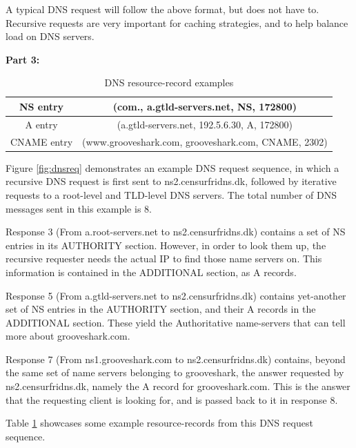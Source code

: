 A typical DNS request will follow the above format, but does not have to. Recursive requests are very important for caching strategies, and
to help balance load on DNS servers.

\noindent \textbf{Part 3:}\\
\begin{table}
\begin{tabular*}{1\textwidth}{| c | c |}
	\hline
	NS entry & (com., a.gtld-servers.net, NS, 172800)\\
	\hline
	A entry & (a.gtld-servers.net, 192.5.6.30, A, 172800)\\
	\hline
	CNAME entry & (www.grooveshark.com, grooveshark.com, CNAME, 2302)\\
	\hline
\end{tabular*}
\caption{DNS resource-record examples}
\label{tbl:rrexamples}
\end{table}

Figure \ref{fig:dnsreq} demonstrates an example DNS request sequence, in which a recursive DNS request is first sent to ns2.censurfridns.dk,
followed by iterative requests to a root-level and TLD-level DNS servers. The total number of DNS messages sent in this example is 8.

Response 3 (From a.root-servers.net to ns2.censurfridns.dk) contains a set of NS entries in its AUTHORITY section. However, in order to look them
up, the recursive requester needs the actual IP to find those name servers on. This information is contained in the ADDITIONAL section, as A
records. 

Response 5 (From a.gtld-servers.net to ns2.censurfridns.dk) contains yet-another set of NS entries in the AUTHORITY section, and their A records
in the ADDITIONAL section. These yield the Authoritative name-servers that can tell more about grooveshark.com.

Response 7 (From ns1.grooveshark.com to ns2.censurfridns.dk) contains, beyond the same set of name servers belonging to grooveshark, the answer
requested by ns2.censurfridns.dk, namely the A record for grooveshark.com. This is the answer that the requesting client is looking for, and
is passed back to it in response 8.

Table \ref{tbl:rrexamples} showcases some example resource-records from this DNS request sequence.

